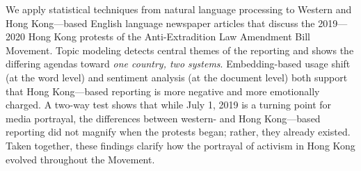 We apply statistical techniques from natural language processing to Western and Hong Kong---based English language newspaper articles that discuss the 2019---2020 Hong Kong protests of the Anti-Extradition Law Amendment Bill Movement. Topic modeling detects central themes of the reporting and shows the differing agendas toward \emph{one country, two systems}. Embedding-based usage shift (at the word level) and sentiment analysis (at the document level) both support that Hong Kong---based reporting is more negative and more emotionally charged. A two-way test shows that while July 1, 2019 is a turning point for media portrayal, the differences between western- and Hong Kong---based reporting did not magnify when the protests began; rather, they already existed. Taken together, these findings clarify how the portrayal of activism in Hong Kong evolved throughout the Movement.
